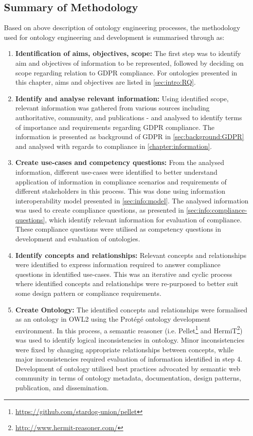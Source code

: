 \subsection*{Summary of Methodology}
Based on above description of ontology engineering processes, the methodology used for ontology engineering and development is summarised through as:
\begin{enumerate}
    \item \textbf{Identification of aims, objectives, scope:} The first step was to identify aim and objectives of information to be represented, followed by deciding on scope regarding relation to GDPR compliance. For ontologies presented in this chapter, aims and objectives are listed in \autoref{sec:intro:RQ}. %
    \item \textbf{Identify and analyse relevant information:} Using identified scope, relevant information was gathered from various sources including authoritative, community, and publications - and analysed to identify terms of importance and requirements regarding GDPR compliance. The information is presented as background of GDPR in \autoref{sec:background:GDPR} and analysed with regards to compliance in \autoref{chapter:information}.
    \item \textbf{Create use-cases and competency questions:} From the analysed information, different use-cases were identified to better understand application of information in compliance scenarios and  requirements of different stakeholders in this process. This was done using information interoperability model presented in \autoref{sec:info:model}. The analysed information was used to create compliance questions, as presented in \autoref{sec:info:compliance-questions}, which identify relevant information for evaluation of compliance. These compliance questions were utilised as competency questions in development and evaluation of ontologies.
    \item \textbf{Identify concepts and relationships:} Relevant concepts and relationships were identified to express information required to answer compliance questions in identified use-cases. This was an iterative and cyclic process where identified concepts and relationships were re-purposed to better suit some design pattern or compliance requirements.
    \item \textbf{Create Ontology:} The identified concepts and relationships were formalised as an ontology in OWL2 using the Protégé ontology development environment. In this process, a semantic reasoner (i.e. Pellet\footnote{\url{https://github.com/stardog-union/pellet}} and HermiT\footnote{\url{http://www.hermit-reasoner.com/}}) was used to identify logical inconsistencies in ontology. Minor inconsistencies were fixed by changing appropriate relationships between concepts, while major inconsistencies required evaluation of information identified in step 4. Development of ontology utilised best practices advocated by semantic web community in terms of ontology metadata, documentation, design patterns, publication, and dissemination.

\end{enumerate}
